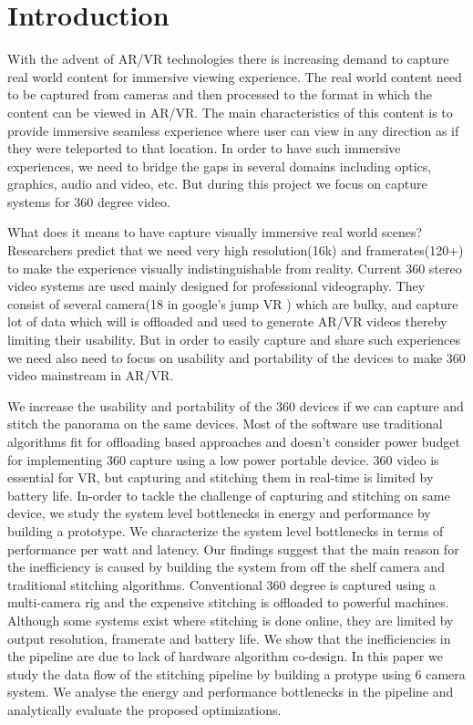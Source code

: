 \chapter{Introduction}

With the advent of AR/VR technologies there is increasing demand to capture real world content for immersive viewing experience. The real world content need to be captured from cameras and then processed to the format in which the content can be viewed in AR/VR. The main characteristics of this content is to provide immersive seamless experience where user can view in any direction as if they were teleported to that location. In order to have such immersive experiences, we need to bridge the gaps in several domains including optics, graphics, audio and video, etc. But during this project we focus on capture systems for 360 degree video. \newline

What does it means to have capture visually immersive real world scenes? Researchers \cite{cuervo2018creating} predict that we need very high resolution(16k) and framerates(120+) to make the experience visually indistinguishable from reality. Current 360 stereo video systems are used mainly designed for professional videography. They consist of several camera(18 in google's jump VR \cite{richardt2017video}) which are bulky, and capture lot of data which will is offloaded and used to generate AR/VR videos thereby limiting their usability. But in order to easily capture and share such experiences we need also need to focus on usability and portability of the devices to make 360 video mainstream in AR/VR.

We increase the usability and portability of the 360 devices if we can capture and stitch the panorama on the same devices. Most of the software use traditional algorithms fit for offloading based approaches and doesn't consider power budget for implementing 360 capture using a low power portable device. 
360 video is essential for VR, but capturing and stitching them in real-time is limited by battery life. In-order to tackle the challenge of capturing and stitching on same device, we study the system level bottlenecks in energy and performance by building a prototype. We characterize the system level bottlenecks in terms of performance per watt and latency. %
Our findings suggest that the main reason for the inefficiency is caused by building the system from off the shelf camera and traditional stitching algorithms. Conventional 360 degree is captured using a multi-camera rig and the expensive stitching is offloaded to powerful machines. Although some systems exist where stitching is done online, they are limited by output resolution, framerate and battery life. We show that the inefficiencies in the pipeline are due to lack of hardware algorithm co-design. In this paper we study the data flow of the stitching pipeline by building a protype using 6 camera system. We analyse the energy and performance bottlenecks in the pipeline and analytically evaluate the proposed optimizations. 
 
